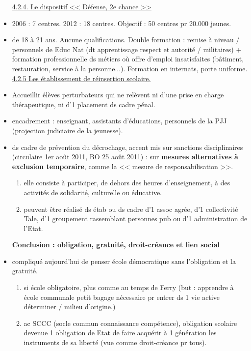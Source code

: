 \documentclass[12pt]{article}
\begin{document}
\begin{itemize}
\underline{4.2.4. Le dispositif << Défense, 2e chance >>} \\

\item 2006 : 7 centres. 2012 : 18 centres. Objectif : 50 centres pr 20.000 jeunes.\\

\item de 18 à 21 ans. Aucune qualifications. Double formation : remise à niveau / personnels de Educ Nat (dt apprentissage respect et autorité / militaires) + formation professionnelle ds métiers où offre d'emploi insatisfaites (bâtiment, restauration, service à la personne...). Formation en internats, porte uniforme.\\

\underline{4.2.5 Les établissement de réinsertion scolaire.} \\

\item Accueillir élèves perturbateurs qui ne relèvent ni d'une prise en charge thérapeutique, ni d'1 placement ds cadre pénal.\\

\item encadrement : enseignant, assistants d'éducations, personnels de la PJJ (projection judiciaire de la jeunesse). \\

\item ds cadre de prévention du décrochage, accent mis sur sanctions disciplinaires (circulaire 1er août 2011, BO 25 août 2011) : sur \textbf{mesures alternatives à exclusion temporaire}, comme la << mesure de responsabilisation >>.\\
\begin{enumerate}
\item elle consiste à participer, de dehors des heures d'enseignement, à des activités de solidarité, culturelle ou éducative.\\
\item peuvent être réalisé ds étab ou ds cadre d'1 assoc agrée, d'1 collectivité Tale, d'1 groupement rassemblant personnes pub ou d'1 administration de l'Etat.\\
\end{enumerate}

\textbf{Conclusion : obligation, gratuité, droit-créance et lien social} \\

\item compliqué aujourd'hui de penser école démocratique sans l'obligation et la gratuité.
\begin{enumerate}
\item  si école obligatoire, plus comme au temps de Ferry (but : apprendre à école communale petit bagage nécessaire pr entrer ds 1 vie active déterminer / milieu d'origine.) \\
\item ac SCCC (socle commun connaissance compétence), obligation scolaire devenue 1 obligation de Etat de faire acquérir à 1 génération les instruments de sa liberté (vue comme droit-créance pr tous). \\
\end{enumerate}


\end{itemize}
\end{document}

